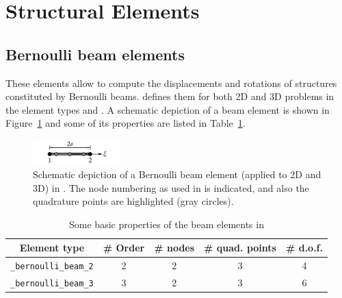 \section{Structural Elements}

\subsection*{Bernoulli beam elements}
These elements allow to compute the displacements and rotations of structures constituted by Bernoulli beams. \akantu defines them for both 2D and 3D problems in the element types  and . A schematic depiction of a beam element is shown in Figure~\ref{fig:elements:bernoulli} and some of its properties are listed in Table~\ref{tab:elements:bernoulli}.


\begin{figure}[htb]
  \centering
  \includegraphics[width=0.3\textwidth]{figures/elements/bernoulli_2}
  \caption{Schematic depiction of a Bernoulli beam element (applied to 2D and 3D) in \akantu. The node numbering as used in \akantu is indicated, and also the quadrature points are highlighted (gray circles).}
  \label{fig:elements:bernoulli}
\end{figure}
\begin{table}[htb]
  \centering
  \begin{tabular}{c|cccc}
    \toprule
    Element type                  & \# Order & \# nodes &\# quad. points & \# d.o.f.\\
    \midrule
    \texttt{\_bernoulli\_beam\_2} &         2&         2&              3&  4\\
    \texttt{\_bernoulli\_beam\_3} &         3&         2&              3&  6\\
    \bottomrule
  \end{tabular}
  \caption{Some basic properties of the beam elements in \akantu}
  \label{tab:elements:bernoulli}
\end{table}
